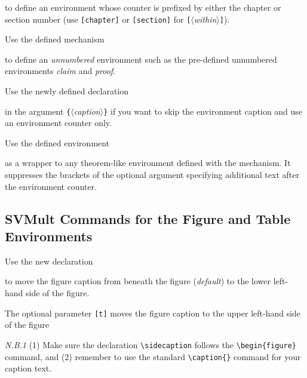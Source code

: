 \documentclass[graybox]{svmult}
\begin{document}
\begin{refguide}
\begin{sloppy}
to define an environment whose counter is prefixed by either the chapter or
section number (use \verb|[chapter]| or \verb|[section]| for \verb|[|$\langle$\textit{within}$\rangle$\verb|]|).

Use the defined mechanism

\cprotect{}

to define an \textit{unnumbered} environment such as the pre-defined unnumbered environments \textit{claim} and \textit{proof}.

Use the newly defined declaration

\cprotect\boxtext{\verb|\nocaption|}

in the argument \verb|{|$\langle$\textit{caption}$\rangle$\verb|}| if you want to skip the environment caption and
use an environment counter only.

Use the defined environment

\cprotect{}

as a wrapper to any theorem-like environment defined with the mechanism. It suppresses the brackets of the optional argument specifying additional
text after the environment counter.

\subsection{SVMult Commands for the Figure and Table Environments}\label{subsec:7}

Use the new declaration

\cprotect{}

to move the figure caption from beneath the figure (\textit{default}) to the lower left-hand side of the figure.

The optional parameter \verb|[t]| moves the figure caption to the upper left-hand
side of the figure

\textit{N.B.1} (1) Make sure the declaration \verb|\sidecaption| follows the \verb|\begin{figure}|
command, and (2) remember to use the standard \verb|\caption{}| command for your
caption text.


\end{sloppy}
\end{refguide}
\end{document}
